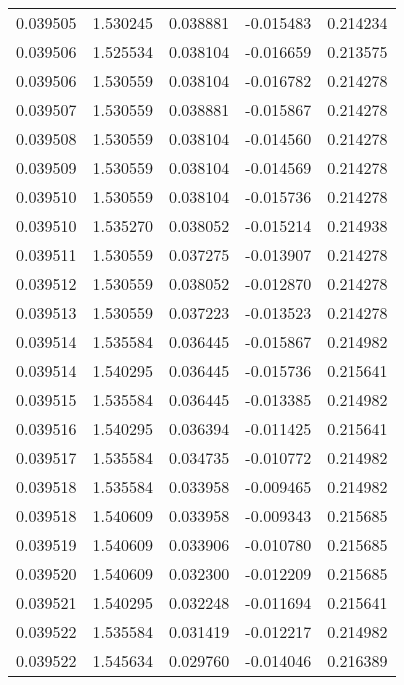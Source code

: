 \begin{tabular}{lrrrr}
0.039505    &  1.530245 &  0.038881 & -0.015483 &             0.214234 \\
0.039506    &  1.525534 &  0.038104 & -0.016659 &             0.213575 \\
0.039506    &  1.530559 &  0.038104 & -0.016782 &             0.214278 \\
0.039507    &  1.530559 &  0.038881 & -0.015867 &             0.214278 \\
0.039508    &  1.530559 &  0.038104 & -0.014560 &             0.214278 \\
0.039509    &  1.530559 &  0.038104 & -0.014569 &             0.214278 \\
0.039510    &  1.530559 &  0.038104 & -0.015736 &             0.214278 \\
0.039510    &  1.535270 &  0.038052 & -0.015214 &             0.214938 \\
0.039511    &  1.530559 &  0.037275 & -0.013907 &             0.214278 \\
0.039512    &  1.530559 &  0.038052 & -0.012870 &             0.214278 \\
0.039513    &  1.530559 &  0.037223 & -0.013523 &             0.214278 \\
0.039514    &  1.535584 &  0.036445 & -0.015867 &             0.214982 \\
0.039514    &  1.540295 &  0.036445 & -0.015736 &             0.215641 \\
0.039515    &  1.535584 &  0.036445 & -0.013385 &             0.214982 \\
0.039516    &  1.540295 &  0.036394 & -0.011425 &             0.215641 \\
0.039517    &  1.535584 &  0.034735 & -0.010772 &             0.214982 \\
0.039518    &  1.535584 &  0.033958 & -0.009465 &             0.214982 \\
0.039518    &  1.540609 &  0.033958 & -0.009343 &             0.215685 \\
0.039519    &  1.540609 &  0.033906 & -0.010780 &             0.215685 \\
0.039520    &  1.540609 &  0.032300 & -0.012209 &             0.215685 \\
0.039521    &  1.540295 &  0.032248 & -0.011694 &             0.215641 \\
0.039522    &  1.535584 &  0.031419 & -0.012217 &             0.214982 \\
0.039522    &  1.545634 &  0.029760 & -0.014046 &             0.216389 \\

\end{tabular}
